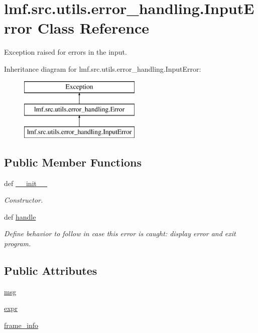 \hypertarget{classlmf_1_1src_1_1utils_1_1error__handling_1_1_input_error}{\section{lmf.\+src.\+utils.\+error\+\_\+handling.\+Input\+Error Class Reference}
\label{classlmf_1_1src_1_1utils_1_1error__handling_1_1_input_error}
}


Exception raised for errors in the input.  


Inheritance diagram for lmf.\+src.\+utils.\+error\+\_\+handling.\+Input\+Error\+:\begin{figure}[H]
\begin{center}
\leavevmode
\includegraphics[height=3.000000cm]{classlmf_1_1src_1_1utils_1_1error__handling_1_1_input_error}
\end{center}
\end{figure}
\subsection*{Public Member Functions}
\begin{DoxyCompactItemize}
\item 
def \hyperlink{classlmf_1_1src_1_1utils_1_1error__handling_1_1_input_error_ac78b36781ea6b31a7c9c7e576c701a5f}{\+\_\+\+\_\+init\+\_\+\+\_\+}
\begin{DoxyCompactList}\small\item\em Constructor. \end{DoxyCompactList}\item 
def \hyperlink{classlmf_1_1src_1_1utils_1_1error__handling_1_1_input_error_aacc052f82e4982bfe41d6589a7a249d9}{handle}
\begin{DoxyCompactList}\small\item\em Define behavior to follow in case this error is caught\+: display error and exit program. \end{DoxyCompactList}\end{DoxyCompactItemize}
\subsection*{Public Attributes}
\begin{DoxyCompactItemize}
\item 
\hyperlink{classlmf_1_1src_1_1utils_1_1error__handling_1_1_input_error_a13dc7af38c991d10bbf04900ecc4a44b}{msg}
\item 
\hyperlink{classlmf_1_1src_1_1utils_1_1error__handling_1_1_input_error_a315f51b60727d5ff945e0017a9838e43}{expr}
\item 
\hyperlink{classlmf_1_1src_1_1utils_1_1error__handling_1_1_input_error_a41ac62579b8419be8fee90ac0b907817}{frame\+\_\+info}
\end{DoxyCompactItemize}


